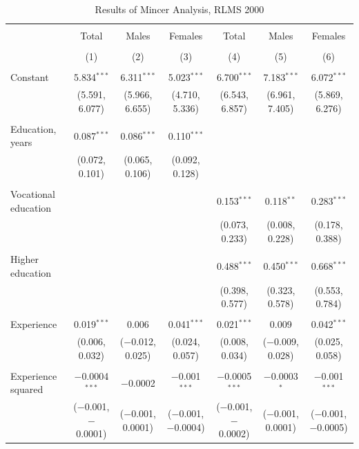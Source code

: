 \documentclass[alpha-refs]{wiley-article-01g}
\begin{document}
\begin{landscape}
	
	\fontsize{9}{11}
	\selectfont
	
	\begin{table}[!htbp] \centering 
\renewcommand{\arraystretch}{1.0}
		\caption{Results of Mincer Analysis, RLMS 2000} 
		\label{} 
		\begin{tabular}{@{\extracolsep{5pt}}lcccccc} 
			\\[-.8ex]\hline 
			\hline \\[-.8ex] 
			& Total & Males & Females & Total & Males & Females \\ 
			\\[-.8ex] & (1) & (2) & (3) & (4) & (5) & (6)\\ 
			\hline \\[-.8ex] 
			Constant & 5.834$^{***}$ & 6.311$^{***}$ & 5.023$^{***}$ & 6.700$^{***}$ & 7.183$^{***}$ & 6.072$^{***}$ \\ 
			& (5.591, 6.077) & (5.966, 6.655) & (4.710, 5.336) & (6.543, 6.857) & (6.961, 7.405) & (5.869, 6.276) \\ 
			& & & & & & \\ 
			Education, years & 0.087$^{***}$ & 0.086$^{***}$ & 0.110$^{***}$ &  &  &  \\ 
			& (0.072, 0.101) & (0.065, 0.106) & (0.092, 0.128) &  &  &  \\ 
			& & & & & & \\ 
			Vocational education &  &  &  & 0.153$^{***}$ & 0.118$^{**}$ & 0.283$^{***}$ \\ 
			&  &  &  & (0.073, 0.233) & (0.008, 0.228) & (0.178, 0.388) \\ 
			& & & & & & \\ 
			Higher education &  &  &  & 0.488$^{***}$ & 0.450$^{***}$ & 0.668$^{***}$ \\ 
			&  &  &  & (0.398, 0.577) & (0.323, 0.578) & (0.553, 0.784) \\ 
			& & & & & & \\ 
			Experience & 0.019$^{***}$ & 0.006 & 0.041$^{***}$ & 0.021$^{***}$ & 0.009 & 0.042$^{***}$ \\ 
			& (0.006, 0.032) & ($-$0.012, 0.025) & (0.024, 0.057) & (0.008, 0.034) & ($-$0.009, 0.028) & (0.025, 0.058) \\ 
			& & & & & & \\ 
			Experience squared & $-$0.0004$^{***}$ & $-$0.0002 & $-$0.001$^{***}$ & $-$0.0005$^{***}$ & $-$0.0003$^{*}$ & $-$0.001$^{***}$ \\ 
			& ($-$0.001, $-$0.0001) & ($-$0.001, 0.0001) & ($-$0.001, $-$0.0004) & ($-$0.001, $-$0.0002) & ($-$0.001, 0.0001) & ($-$0.001, $-$0.0005) \\ 

\end{tabular}
\end{table}
\end{landscape}
\end{document}
